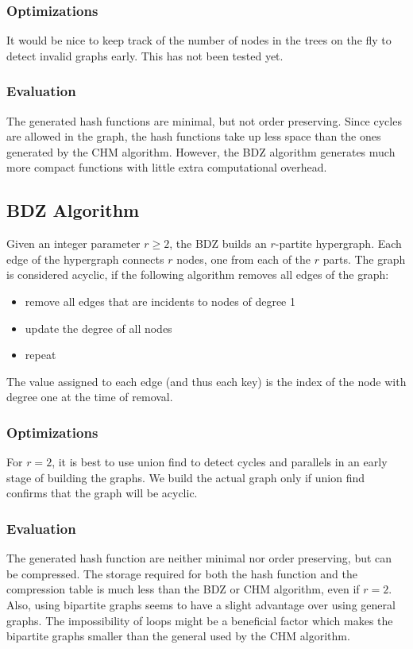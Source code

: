 \documentclass{article}
\begin{document}
\subsubsection{Optimizations}
It would be nice to keep track of the number of nodes in the trees on the fly 
to detect invalid graphs early. This has not been tested yet.

\subsubsection{Evaluation}
The generated hash functions are minimal, but not order preserving.
Since cycles are allowed in the graph, the hash functions take up less space 
than the ones generated by the CHM algorithm. However, the BDZ algorithm 
generates much more compact functions with little extra computational overhead.


\subsection{BDZ Algorithm}

Given an integer parameter $r\ge 2$, the BDZ builds an $r$-partite hypergraph.
Each edge of the hypergraph connects $r$ nodes, one from each of the $r$ parts.
The graph is considered acyclic, if the following algorithm removes all edges 
of the graph:
\begin{itemize}
\item remove all edges that are incidents to nodes of degree 1
\item update the degree of all nodes
\item repeat
\end{itemize}

The value assigned to each edge (and thus each key) is the index of the node
with degree one at the time of removal.

\subsubsection{Optimizations}
For $r=2$, it is best to use union find to detect cycles and parallels 
in an early stage of building the graphs. We build the actual graph only if 
union find confirms that the graph will be acyclic.

\subsubsection{Evaluation}
The generated hash function are neither minimal nor order preserving, but can 
be compressed.
The storage required for both the hash function and the compression table is 
much less than the BDZ or CHM algorithm, even if $r=2$.
Also, using bipartite graphs seems to have a slight advantage over using 
general graphs. The impossibility of loops might be a beneficial factor which
makes the bipartite graphs smaller than the general used by the CHM algorithm.
\end{document}
